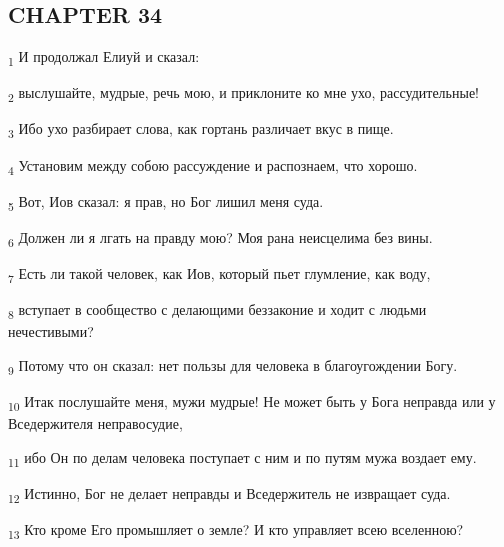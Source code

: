 \subsection{CHAPTER 34}
\begin{tcolorbox}
\textsubscript{1} И продолжал Елиуй и сказал:
\end{tcolorbox}
\begin{tcolorbox}
\textsubscript{2} выслушайте, мудрые, речь мою, и приклоните ко мне ухо, рассудительные!
\end{tcolorbox}
\begin{tcolorbox}
\textsubscript{3} Ибо ухо разбирает слова, как гортань различает вкус в пище.
\end{tcolorbox}
\begin{tcolorbox}
\textsubscript{4} Установим между собою рассуждение и распознаем, что хорошо.
\end{tcolorbox}
\begin{tcolorbox}
\textsubscript{5} Вот, Иов сказал: я прав, но Бог лишил меня суда.
\end{tcolorbox}
\begin{tcolorbox}
\textsubscript{6} Должен ли я лгать на правду мою? Моя рана неисцелима без вины.
\end{tcolorbox}
\begin{tcolorbox}
\textsubscript{7} Есть ли такой человек, как Иов, который пьет глумление, как воду,
\end{tcolorbox}
\begin{tcolorbox}
\textsubscript{8} вступает в сообщество с делающими беззаконие и ходит с людьми нечестивыми?
\end{tcolorbox}
\begin{tcolorbox}
\textsubscript{9} Потому что он сказал: нет пользы для человека в благоугождении Богу.
\end{tcolorbox}
\begin{tcolorbox}
\textsubscript{10} Итак послушайте меня, мужи мудрые! Не может быть у Бога неправда или у Вседержителя неправосудие,
\end{tcolorbox}
\begin{tcolorbox}
\textsubscript{11} ибо Он по делам человека поступает с ним и по путям мужа воздает ему.
\end{tcolorbox}
\begin{tcolorbox}
\textsubscript{12} Истинно, Бог не делает неправды и Вседержитель не извращает суда.
\end{tcolorbox}
\begin{tcolorbox}
\textsubscript{13} Кто кроме Его промышляет о земле? И кто управляет всею вселенною?
\end{tcolorbox}
